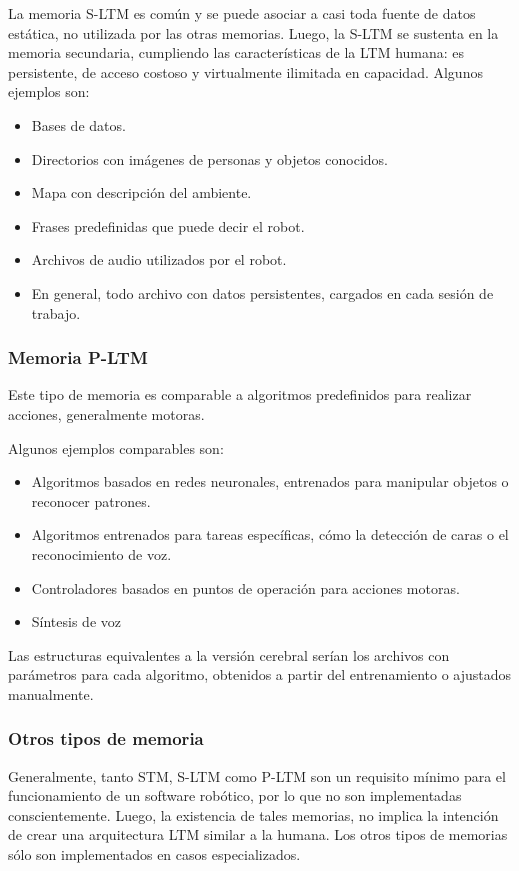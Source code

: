 La memoria S-LTM es común y se puede asociar a casi toda fuente de datos estática, no utilizada por las otras memorias. Luego, la S-LTM se sustenta en la memoria secundaria, cumpliendo las características de la LTM humana: es persistente, de acceso costoso y virtualmente ilimitada en capacidad. Algunos ejemplos son:
\begin{itemize}[topsep=0pt]
\setlength\itemsep{0.2em}
\item Bases de datos.
\item Directorios con imágenes de personas y objetos conocidos.
\item Mapa con descripción del ambiente.
\item Frases predefinidas que puede decir el robot.
\item Archivos de audio utilizados por el robot.
\item En general, todo archivo con datos persistentes, cargados en cada sesión de trabajo.
\end{itemize}


\subsubsection{Memoria P-LTM}

Este tipo de memoria es comparable a algoritmos predefinidos para realizar acciones, generalmente motoras. 

Algunos ejemplos comparables son: 
\begin{itemize}[topsep=0pt]
\setlength\itemsep{0.2em}
\item Algoritmos basados en redes neuronales, entrenados para manipular objetos o reconocer patrones.
\item Algoritmos entrenados para tareas específicas, cómo la detección de caras o el reconocimiento de voz.
\item Controladores basados en puntos de operación para acciones motoras.
\item Síntesis de voz
\end{itemize}

Las estructuras equivalentes a la versión cerebral serían los archivos con parámetros para cada algoritmo, obtenidos a partir del entrenamiento o ajustados manualmente.


\subsubsection{Otros tipos de memoria}

Generalmente, tanto STM, S-LTM como P-LTM son un requisito mínimo para el funcionamiento de un software robótico, por lo que no son implementadas conscientemente. Luego, la existencia de tales memorias, no implica la intención de crear una arquitectura LTM similar a la humana. Los otros tipos de memorias sólo son implementados en casos especializados.



